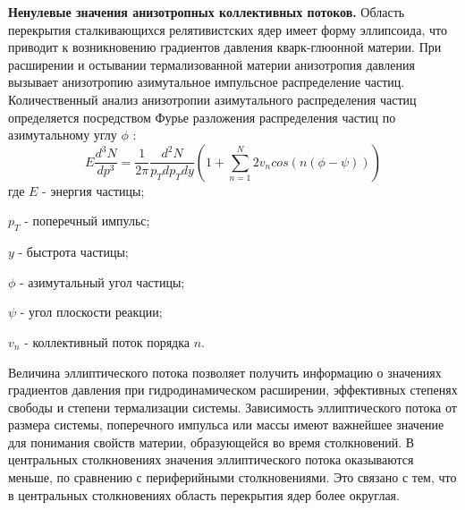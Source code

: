 

\textbf{Ненулевые значения анизотропных коллективных потоков.}
Область перекрытия сталкивающихся релятивистских ядер имеет форму эллипсоида, что приводит к возникновению градиентов давления кварк-глюонной материи. При расширении и остывании термализованной материи анизотропия давления вызывает анизотропию азимутальное импульсное распределение частиц. Количественный анализ анизотропии азимутального распределения частиц определяется посредством Фурье разложения распределения частиц по азимутальному углу $\phi$ \cite{QGP_signatures}:
$$ E \frac{d^3N}{dp^3} = \frac{1}{2\pi} \frac{d^2N}{p_T dp_T dy} 
(1+\sum_{n=1}^{N} 2v_n cos(n(\phi - \psi)))$$
где $E$ - энергия частицы;
 
$p_T$ - поперечный импульс;

$y$ - быстрота частицы;

$\phi$ - азимутальный угол частицы;
 
$\psi$ - угол плоскости реакции;

$v_n$ - коллективный поток порядка $n$. 

Величина эллиптического потока позволяет получить информацию о значениях градиентов давления при гидродинамическом расширении, эффективных степенях свободы и степени термализации системы. Зависимость эллиптического потока от размера системы, поперечного импульса или массы имеют важнейшее значение для понимания свойств материи, образующейся во время столкновений. 
В центральных столкновениях значения эллиптического потока оказываются меньше, по сравнению с периферийными столкновениями. Это связано с тем, что в центральных столкновениях область перекрытия ядер более округлая.

